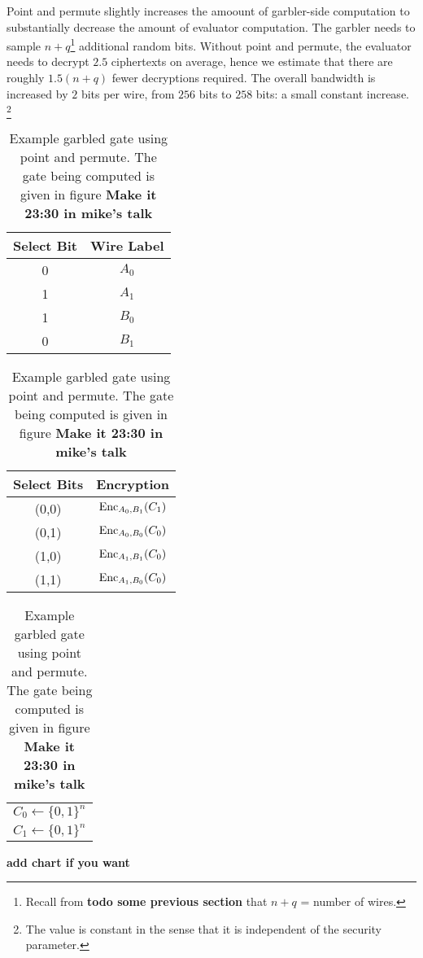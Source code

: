 Point and permute slightly increases the amoount of garbler-side computation to substantially decrease the amount of evaluator computation.
The garbler needs to sample $n+q$\footnote{Recall from \textbf{todo some previous section} that $n+q$ = number of wires.} additional random bits.
Without point and permute, the evaluator needs to decrypt $2.5$ ciphertexts on average, hence we estimate that there are roughly $1.5(n+q)$ fewer decryptions required.
The overall bandwidth is increased by $2$ bits per wire, from $256$ bits to $258$ bits: a small constant increase. \footnote{The value is constant in the sense that it is independent of the security parameter.}

\begin{table}[h]
    \centering
    \begin{tabular}{|c|c|}
    \hline
    Select Bit & Wire Label \\
    \hline
    0 & $A_0$ \\
    1 & $A_1$ \\
    1 & $B_0$ \\
    0 & $B_1$ \\
    \hline
    \end{tabular}
    \qquad
    \begin{tabular}{|c|c|}
    \hline
    Select Bits & Encryption \\
    \hline
    (0,0) & $\operatorname{Enc}_{A_0, B_1}(C_1)$ \\
    (0,1) & $\operatorname{Enc}_{A_0, B_0}(C_0)$ \\
    (1,0) & $\operatorname{Enc}_{A_1, B_1}(C_0)$ \\
    (1,1) & $\operatorname{Enc}_{A_1, B_0}(C_0)$ \\
    \hline
    \end{tabular}
    \qquad
    \begin{tabular}{|c|}
    \hline
    $C_0 \gets \{0,1\}^n$ \\
    $C_1 \gets \{0,1\}^n$ \\
    \hline
    \end{tabular}
    \caption{Garbled Gate for Point and Permute}
    \caption{Example garbled gate using point and permute. The gate being computed is given in figure \textbf{Make it 23:30 in mike's talk}}
\end{table}

\textbf{add chart if you want}

